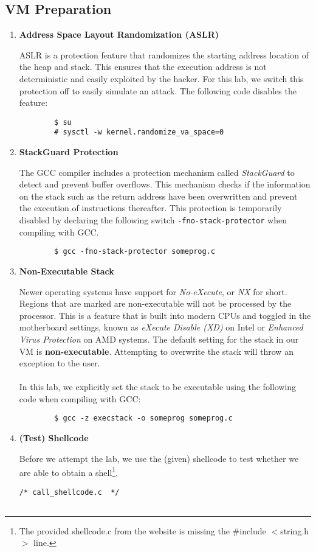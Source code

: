 \documentclass[a4paper,12pt]{article}
\begin{document}
\subsection{VM Preparation}
\vspace{1em}
\begin{enumerate}
	\item \textbf{Address Space Layout Randomization (ASLR)} \begin{par}ASLR is a protection feature that randomizes the starting address location of the heap and stack. This ensures that the execution address is not deterministic and easily exploited by the hacker. For this lab, we switch this protection off to easily simulate an attack. The following code disables the feature:
		\begin{verbatim}
		$ su
		# sysctl -w kernel.randomize_va_space=0
		\end{verbatim}
	\end{par}
	\item \textbf{StackGuard Protection}\begin{par}The GCC compiler includes a protection mechanism called \textit{StackGuard} to detect and prevent buffer overflows. This mechanism checks if the information on the stack such as the return address have been overwritten and prevent the execution of instructions thereafter. This protection is temporarily disabled by declaring the following switch \texttt{-fno-stack-protector} when compiling with GCC.\begin{verbatim}
		$ gcc -fno-stack-protector someprog.c\end{verbatim}
	\end{par}
	\item \textbf{Non-Executable Stack}\begin{par}Newer operating systems have support for \textit{No-eXecute}, or \textit{NX} for short. Regions that are marked are non-executable will not be processed by the processor. This is a feature that is built into modern CPUs and toggled in the motherboard settings, known as \textit{eXecute Disable (XD)} on Intel or \textit{Enhanced Virus Protection} on AMD systems. The default setting for the stack in our VM is  \textbf{non-executable}. Attempting to overwrite the stack will throw an exception to the user. \\\\In this lab, we explicitly set the stack to be executable using the following code when compiling with GCC:
		\begin{verbatim}
		$ gcc -z execstack -o someprog someprog.c
		\end{verbatim}
	\end{par}
	\newpage
	\item \textbf{(Test) Shellcode} \begin{par}
		Before we attempt the lab, we use the (given) shellcode to test whether we are able to obtain a shell\footnote{The provided shellcode.c from the website is missing the
			\#include $<$string.h$>$ line.}.\end{par}
	\begin{verbatim}
/* call_shellcode.c  */
	

\end{verbatim}
\end{enumerate}
\end{document}
